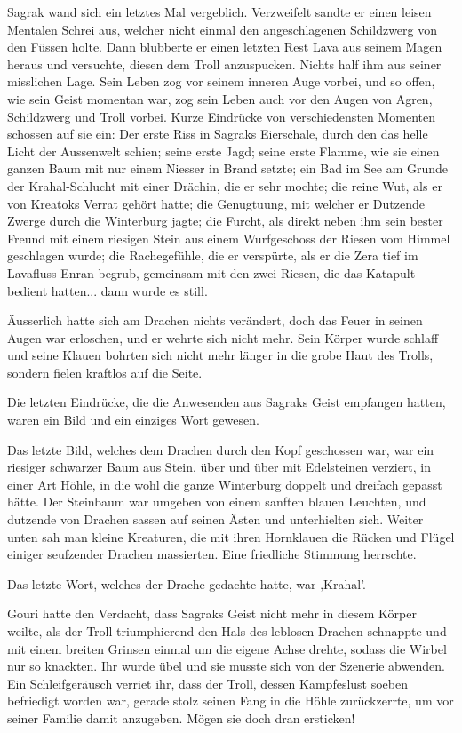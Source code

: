 Sagrak wand sich ein letztes Mal vergeblich. Verzweifelt sandte er einen leisen Mentalen Schrei aus, welcher nicht einmal den angeschlagenen Schildzwerg von den Füssen holte. Dann blubberte er einen letzten Rest Lava aus seinem Magen heraus und versuchte, diesen dem Troll anzuspucken. Nichts half ihm aus seiner misslichen Lage. Sein Leben zog vor seinem inneren Auge vorbei, und so offen, wie sein Geist momentan war, zog sein Leben auch vor den Augen von Agren, Schildzwerg und Troll vorbei. Kurze Eindrücke von verschiedensten Momenten schossen auf sie ein: Der erste Riss in Sagraks Eierschale, durch den das helle Licht der Aussenwelt schien; seine erste Jagd; seine erste Flamme, wie sie einen ganzen Baum mit nur einem Niesser in Brand setzte; ein Bad im See am Grunde der Krahal-Schlucht mit einer Drächin, die er sehr mochte; die reine Wut, als er von Kreatoks Verrat gehört hatte; die Genugtuung, mit welcher er Dutzende Zwerge durch die Winterburg jagte; die Furcht, als direkt neben ihm sein bester Freund mit einem riesigen Stein aus einem Wurfgeschoss der Riesen vom Himmel geschlagen wurde; die Rachegefühle, die er verspürte, als er die Zera tief im Lavafluss Enran begrub, gemeinsam mit den zwei Riesen, die das Katapult bedient hatten... dann wurde es still.

Äusserlich hatte sich am Drachen nichts verändert, doch das Feuer in seinen Augen war erloschen, und er wehrte sich nicht mehr. Sein Körper wurde schlaff und seine Klauen bohrten sich nicht mehr länger in die grobe Haut des Trolls, sondern fielen kraftlos auf die Seite.

Die letzten Eindrücke, die die Anwesenden aus Sagraks Geist empfangen hatten, waren ein Bild und ein einziges Wort gewesen.

Das letzte Bild, welches dem Drachen durch den Kopf geschossen war, war ein riesiger schwarzer Baum aus Stein, über und über mit Edelsteinen verziert, in einer Art Höhle, in die wohl die ganze Winterburg doppelt und dreifach gepasst hätte. Der Steinbaum war umgeben von einem sanften blauen Leuchten, und dutzende von Drachen sassen auf seinen Ästen und unterhielten sich. Weiter unten sah man kleine Kreaturen, die mit ihren Hornklauen die Rücken und Flügel einiger seufzender Drachen massierten. Eine friedliche Stimmung herrschte.

Das letzte Wort, welches der Drache gedachte hatte, war ‚Krahal’.

Gouri hatte den Verdacht, dass Sagraks Geist nicht mehr in diesem Körper weilte, als der Troll triumphierend den Hals des leblosen Drachen schnappte und mit einem breiten Grinsen einmal um die eigene Achse drehte, sodass die Wirbel nur so knackten. Ihr wurde übel und sie musste sich von der Szenerie abwenden. Ein Schleifgeräusch verriet ihr, dass der Troll, dessen Kampfeslust soeben befriedigt worden war, gerade stolz seinen Fang in die Höhle zurückzerrte, um vor seiner Familie damit anzugeben. Mögen sie doch dran ersticken!

